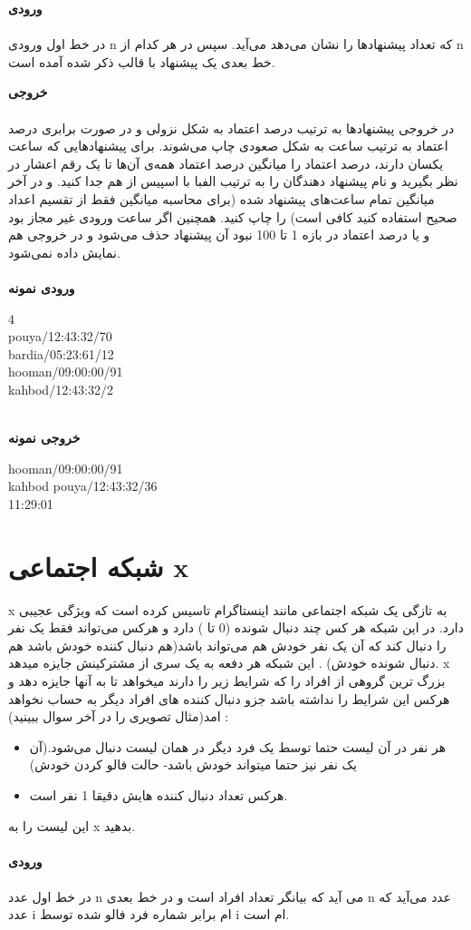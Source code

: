 \documentclass[]{article}
\newcommand{\inputsample}[1]{
    ~\\
    \textbf{ورودی نمونه}
    ~\\
    \begin{tcolorbox}[breakable,boxrule=0pt]
        \begin{latin}
            \large{
                #1
            }
        \end{latin}
    \end{tcolorbox}
}
\newcommand{\outputsample}[1]{
    ~\\
    \textbf{خروجی نمونه}

    \begin{tcolorbox}[breakable,boxrule=0pt]
        \begin{latin}
            \large{
                #1
            }
        \end{latin}
    \end{tcolorbox}
}
\begin{document}
\vspace{1cm}



\textbf{ورودی}
\\ \\
در خط اول ورودی 
n 
که تعداد پیشنهاد‌ها را نشان می‌دهد می‌آید.
سپس در هر کدام از
n
خط بعدی یک پیشنهاد با قالب ذکر شده آمده است. 



\vspace{1cm}

\textbf{خروجی}
\\\\
در خروجی پیشنهادها به ترتیب درصد اعتماد به شکل نزولی و در صورت برابری درصد اعتماد به ترتیب ساعت به شکل صعودی چاپ می‌شوند. برای پیشنهاد‌هایی که ساعت یکسان 
دارند، درصد اعتماد را میانگین درصد اعتماد همه‌ی آن‌ها تا یک رقم اعشار در نظر بگیرید و نام پیشنهاد دهندگان را به ترتیب الفبا با اسپیس از هم جدا کنید.
و در آخر میانگین تمام ساعت‌های پیشنهاد شده (برای محاسبه میانگین فقط از تقسیم اعداد صحیح استفاده کنید کافی است) را چاپ کنید.
 همچنین اگر ساعت ورودی غیر مجاز بود و یا درصد اعتماد در بازه 1 تا 100 نبود آن پیشنهاد حذف می‌شود و در خروجی هم نمایش داده نمی‌شود.
\\


\inputsample{
4
\\
pouya/12:43:32/70
\\
bardia/05:23:61/12
\\
hooman/09:00:00/91
\\
kahbod/12:43:32/2
}

\outputsample{
hooman/09:00:00/91
\\
kahbod pouya/12:43:32/36
\\
11:29:01
}

\newpage
\section{شبکه اجتماعی x}


x به تازگی یک شبکه اجتماعی مانند اینستاگرام تاسیس کرده است که ویژگی عجیبی دارد. در این شبکه هر کس چند دنبال شونده (0 تا ) دارد و هرکس می‌تو‌‌‌اند فقط یک نفر را دنبال کند که آن یک نفر خودش هم می‌تواند باشد(هم دنبال کننده خودش باشد هم دنبال شونده خودش) . این شبکه هر دفعه به یک سری از مشترکینش جایزه میدهد. x  بزرگ ترین گروهی از افراد را که شرایط زیر را دارند میخواهد تا به آنها جایزه دهد و هرکس این شرایط را نداشته باشد جزو دنبال کننده های افراد دیگر به حساب نخواهد امد(مثال تصویری را در آخر سوال ببینید) :
\begin{itemize}
\item
 هر نفر در آن لیست حتما توسط یک فرد دیگر در همان لیست دنبال می‌شود.(آن یک نفر نیز حتما میتواند خودش باشد- حالت فالو کردن خودش)
\item
هرکس تعداد دنبال کننده هایش دقیقا 1 نفر است.
\end{itemize}
این لیست را به x بدهید.\\\\
\textbf{ورودی}\\\\
در خط اول عدد n می آید که بیانگر تعداد افراد است و در خط بعدی n عدد می‌آید که عدد i ام برابر شماره فرد فالو شده توسط i ام است.\\
\end{document}
